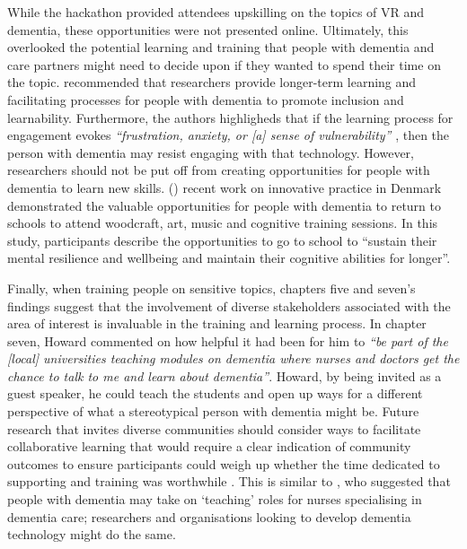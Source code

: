 While the hackathon provided attendees upskilling on the topics of VR and dementia, these opportunities were not presented online. Ultimately, this overlooked the potential learning and training that people with dementia and care partners might need to decide upon if they wanted to spend their time on the topic. \cite{hwang2020exploring} recommended that researchers provide longer-term learning and facilitating processes for people with dementia to promote inclusion and learnability. Furthermore, the authors highligheds that if the learning process for engagement evokes \textit{``frustration, anxiety, or [a] sense of vulnerability''} \citep[p.46:26]{hwang2020exploring}, then the person with dementia may resist engaging with that technology. However, researchers should not be put off from creating opportunities for people with dementia to learn new skills. \citeauthor{ward2020going} (\citeyear{ward2020going}) recent work on innovative practice in Denmark demonstrated the valuable opportunities for people with dementia to return to schools to attend woodcraft, art, music and cognitive training sessions. In this study, participants describe the opportunities to go to school to ``sustain their mental resilience and wellbeing and maintain their cognitive abilities for longer''.

Finally, when training people on sensitive topics, chapters five and seven's findings suggest that the involvement of diverse stakeholders associated with the area of interest is invaluable in the training and learning process. In chapter seven, Howard commented on how helpful it had been for him to \textit{``be part of the [local] universities teaching modules on dementia where nurses and doctors get the chance to talk to me and learn about dementia''}. Howard, by being invited as a guest speaker, he could teach the students and open up ways for a different perspective of what a stereotypical person with dementia might be. Future research that invites diverse communities should consider ways to facilitate collaborative learning that would require a clear indication of community outcomes to ensure participants could weigh up whether the time dedicated to supporting and training was worthwhile \citep{hayes2020inclusive}. This is similar to \cite{skog2000patient}, who suggested that people with dementia may take on `teaching' roles for nurses specialising in dementia care; researchers and organisations looking to develop dementia technology might do the same.

